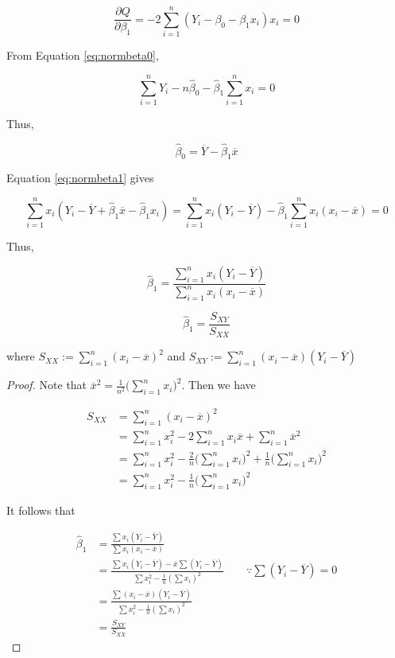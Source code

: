 \documentclass[]{book}
\theoremstyle{definition}
\theoremstyle{definition}
\theoremstyle{definition}
\theoremstyle{remark}
\let\BeginKnitrBlock\begin \let\EndKnitrBlock\end
\begin{document}
\begin{equation}
  \frac{\partial Q}{\partial \beta_1} = -2 \sum_{i = 1}^n (Y_i - \beta_0 - \beta_1 x_i)x_i = 0
  \label{eq:normbeta1}
\end{equation}

From Equation \eqref{eq:normbeta0},

\[\sum_{i = 1}^n Y_i - n \hat\beta_0 - \hat\beta_1 \sum_{i = 1}^n x_i = 0\]

Thus,

\[\hat\beta_0 = \overline{Y} - \hat\beta_1 \overline{x}\]

Equation \eqref{eq:normbeta1} gives

\[\sum_{i = 1}^n x_i (Y_i - \overline{Y} + \hat\beta_1\overline{x} - \hat\beta_1 x_i) = \sum_{i = 1}^n x_i(Y_i - \overline{Y}) - \hat\beta_1\sum_{i = 1}^n x_i (x_i - \overline{x}) = 0\]

Thus,

\[\hat\beta_1 = \frac{\sum\limits_{i = 1}^nx_i(Y_i - \overline{Y})}{\sum\limits_{i = 1}^n x_i (x_i - \overline{x})}\]

\BeginKnitrBlock{remark}
{}\[\hat\beta_1 = \frac{S_{XY}}{S_{XX}}\]

where \(S_{XX} := \sum\limits_{i = 1}^n (x_i - \overline{x})^2\) and \(S_{XY} := \sum\limits_{i = 1}^n (x_i - \overline{x})(Y_i - \overline{Y})\)
\EndKnitrBlock{remark}

\BeginKnitrBlock{proof}
{}Note that \(\overline{x}^2 = \frac{1}{n^2}\bigg(\sum\limits_{i = 1}^n x_i\bigg)^2\). Then we have

\begin{equation}
  \begin{split}
    S_{XX} & = \sum_{i = 1}^n (x_i - \overline{x})^2 \\
    & = \sum_{i = 1}^n x_i^2 - 2\sum_{i = 1}^n x_i \overline{x} + \sum_{i = 1}^n\overline{x}^2 \\
    & = \sum_{i = 1}^n x_i^2 - \frac{2}{n}\bigg(\sum\limits_{i = 1}^n x_i\bigg)^2 + \frac{1}{n}\bigg(\sum\limits_{i = 1}^n x_i\bigg)^2 \\
    & = \sum_{i = 1}^n x_i^2 - \frac{1}{n}\bigg(\sum\limits_{i = 1}^n x_i\bigg)^2
  \end{split}
  \label{eq:sxx}
\end{equation}

It follows that

\begin{equation*}
  \begin{split}
    \hat\beta_1 & = \frac{\sum x_i(Y_i - \overline{Y})}{\sum x_i (x_i - \overline{x})} \\
    & = \frac{\sum x_i (Y_i - \overline{Y}) - \overline{x}\sum (Y_i - \overline{Y})}{\sum x_i^2 - \frac{1}{n} (\sum x_i)^2} \qquad \because \sum (Y_i - \overline{Y}) = 0 \\
    & = \frac{\sum (x_i - \overline{x})(Y_i - \overline{Y})}{\sum x_i^2 - \frac{1}{n} (\sum x_i)^2} \\
    & = \frac{S_{XY}}{S_{XX}}
  \end{split}
\end{equation*}
\EndKnitrBlock{proof}
\end{document}
